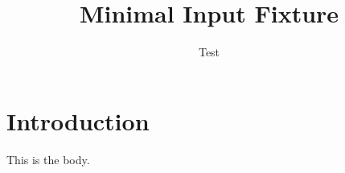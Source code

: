 \documentclass{article}
\title{Minimal Input Fixture}
\author{Test}
\begin{document}
\maketitle
\section{Introduction}
This is the body.


\end{document}

